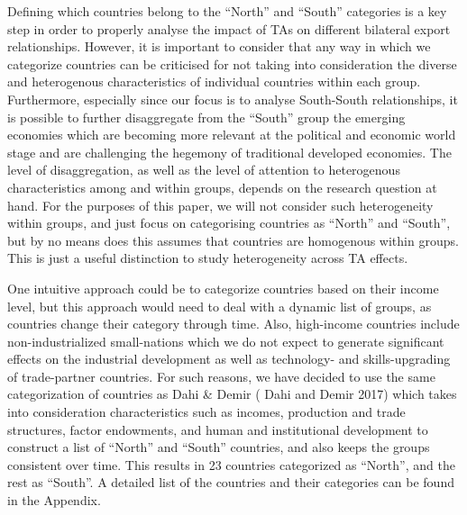 Defining which countries belong to the ``North'' and ``South''
categories is a key step in order to properly analyse the impact of TAs
on different bilateral export relationships. However, it is important to
consider that any way in which we categorize countries can be criticised
for not taking into consideration the diverse and heterogenous
characteristics of individual countries within each group. Furthermore,
especially since our focus is to analyse South-South relationships, it
is possible to further disaggregate from the ``South'' group the
emerging economies which are becoming more relevant at the political and
economic world stage and are challenging the hegemony of traditional
developed economies. The level of disaggregation, as well as the level
of attention to heterogenous characteristics among and within groups,
depends on the research question at hand. For the purposes of this
paper, we will not consider such heterogeneity within groups, and just
focus on categorising countries as ``North'' and ``South'', but by no
means does this assumes that countries are homogenous within groups.
This is just a useful distinction to study heterogeneity across TA
effects.

One intuitive approach could be to categorize countries based on their
income level, but this approach would need to deal with a dynamic list
of groups, as countries change their category through time. Also,
high-income countries include non-industrialized small-nations which we
do not expect to generate significant effects on the industrial
development as well as technology- and skills-upgrading of trade-partner
countries. For such reasons, we have decided to use the same
categorization of countries as Dahi \& Demir (\cite{dahi_south-south_2017} Dahi and Demir 2017) which
takes into consideration characteristics such as incomes, production and
trade structures, factor endowments, and human and institutional
development to construct a list of ``North'' and ``South'' countries,
and also keeps the groups consistent over time. This results in 23
countries categorized as ``North'', and the rest as ``South''. A
detailed list of the countries and their categories can be found in the
Appendix.